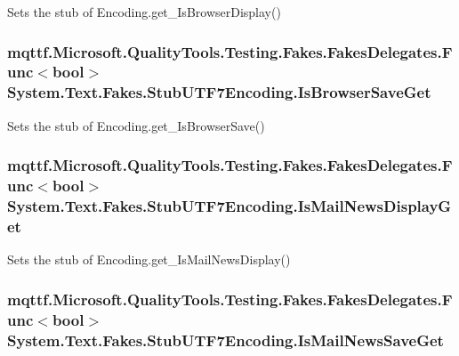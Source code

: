 Sets the stub of Encoding.\-get\-\_\-\-Is\-Browser\-Display()

\hypertarget{class_system_1_1_text_1_1_fakes_1_1_stub_u_t_f7_encoding_aab9825399e1e469af090f4126b0555ee}{
\subsubsection[{Is\-Browser\-Save\-Get}]{\setlength{\rightskip}{0pt plus 5cm}mqttf.\-Microsoft.\-Quality\-Tools.\-Testing.\-Fakes.\-Fakes\-Delegates.\-Func$<$bool$>$ System.\-Text.\-Fakes.\-Stub\-U\-T\-F7\-Encoding.\-Is\-Browser\-Save\-Get}}\label{class_system_1_1_text_1_1_fakes_1_1_stub_u_t_f7_encoding_aab9825399e1e469af090f4126b0555ee}


Sets the stub of Encoding.\-get\-\_\-\-Is\-Browser\-Save()

\hypertarget{class_system_1_1_text_1_1_fakes_1_1_stub_u_t_f7_encoding_aeef15586bb149174513850b1ac12ac65}{
\subsubsection[{Is\-Mail\-News\-Display\-Get}]{\setlength{\rightskip}{0pt plus 5cm}mqttf.\-Microsoft.\-Quality\-Tools.\-Testing.\-Fakes.\-Fakes\-Delegates.\-Func$<$bool$>$ System.\-Text.\-Fakes.\-Stub\-U\-T\-F7\-Encoding.\-Is\-Mail\-News\-Display\-Get}}\label{class_system_1_1_text_1_1_fakes_1_1_stub_u_t_f7_encoding_aeef15586bb149174513850b1ac12ac65}


Sets the stub of Encoding.\-get\-\_\-\-Is\-Mail\-News\-Display()

\hypertarget{class_system_1_1_text_1_1_fakes_1_1_stub_u_t_f7_encoding_a0b563ec9f3e23cffd4e332377ce9c1e7}{
\subsubsection[{Is\-Mail\-News\-Save\-Get}]{\setlength{\rightskip}{0pt plus 5cm}mqttf.\-Microsoft.\-Quality\-Tools.\-Testing.\-Fakes.\-Fakes\-Delegates.\-Func$<$bool$>$ System.\-Text.\-Fakes.\-Stub\-U\-T\-F7\-Encoding.\-Is\-Mail\-News\-Save\-Get}}\label{class_system_1_1_text_1_1_fakes_1_1_stub_u_t_f7_encoding_a0b563ec9f3e23cffd4e332377ce9c1e7}


